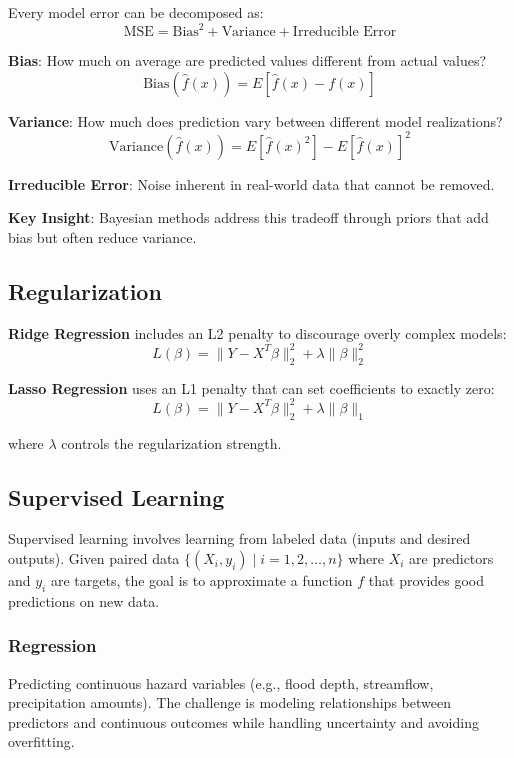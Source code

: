 \documentclass[
  letterpaper,
  DIV=11,
  numbers=noendperiod]{scrreprt}
\begin{document}
Every model error can be decomposed as: \[
\text{MSE} = \text{Bias}^2 + \text{Variance} + \text{Irreducible Error}
\]

\textbf{Bias}: How much on average are predicted values different from
actual values? \[
\text{Bias}(\hat{f}(x)) = E[\hat{f}(x) - f(x)]
\]

\textbf{Variance}: How much does prediction vary between different model
realizations? \[
\text{Variance}(\hat{f}(x)) = E[\hat{f}(x)^2] - E[\hat{f}(x)]^2
\]

\textbf{Irreducible Error}: Noise inherent in real-world data that
cannot be removed.

\textbf{Key Insight}: Bayesian methods address this tradeoff through
priors that add bias but often reduce variance.

\subsection{Regularization}\label{regularization}

\textbf{Ridge Regression} includes an L2 penalty to discourage overly
complex models: \[
L(\beta) = \| Y - X^T \beta \|_2^2 + \lambda \| \beta \|_2^2
\]

\textbf{Lasso Regression} uses an L1 penalty that can set coefficients
to exactly zero: \[
L(\beta) = \| Y - X^T \beta \|_2^2 + \lambda \| \beta \|_1
\]

where \(\lambda\) controls the regularization strength.

\subsection{Supervised Learning}\label{supervised-learning}

Supervised learning involves learning from labeled data (inputs and
desired outputs). Given paired data
\(\{(X_i, y_i) \mid i = 1, 2, \ldots, n\}\) where \(X_i\) are predictors
and \(y_i\) are targets, the goal is to approximate a function \(f\)
that provides good predictions on new data.

\subsubsection{Regression}\label{regression}

Predicting continuous hazard variables (e.g., flood depth, streamflow,
precipitation amounts). The challenge is modeling relationships between
predictors and continuous outcomes while handling uncertainty and
avoiding overfitting.
\end{document}
